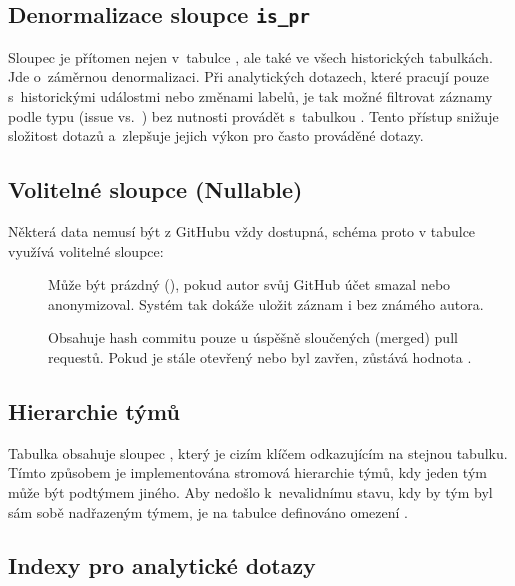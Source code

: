 \subsection{Denormalizace sloupce \texttt{is\_pr}}
\label{subsec:implementation:db_scheme:is_pr_denormalization}

Sloupec  je přítomen nejen v~tabulce , ale také ve všech historických tabulkách. Jde o~záměrnou denormalizaci. Při analytických dotazech, které pracují pouze s~historickými událostmi nebo změnami labelů, je tak možné filtrovat záznamy podle typu (issue vs.\ \PR) bez nutnosti provádět  s~tabulkou . Tento přístup snižuje složitost dotazů a~zlepšuje jejich výkon pro často prováděné dotazy.

\subsection{Volitelné sloupce (Nullable)}
\label{subsec:implementation:db_scheme:nullable}

Některá data nemusí být z GitHubu vždy dostupná, schéma proto v tabulce  využívá volitelné sloupce:

\begin{description}
  \item[] Může být prázdný (), pokud autor svůj GitHub účet smazal nebo anonymizoval. Systém tak dokáže uložit záznam i bez známého autora.
  \item[] Obsahuje hash commitu pouze u úspěšně sloučených (merged) pull requestů. Pokud je \PR stále otevřený nebo byl zavřen, zůstává hodnota .
\end{description}

\subsection{Hierarchie týmů}
\label{subsec:implementation:db_scheme:team_hierarchy}

Tabulka  obsahuje sloupec , který je cizím klíčem odkazujícím na stejnou tabulku. Tímto způsobem je implementována stromová hierarchie týmů, kdy jeden tým může být podtýmem jiného. Aby nedošlo k~nevalidnímu stavu, kdy by tým byl sám sobě nadřazeným týmem, je na tabulce definováno  omezení .

\subsection{Indexy pro analytické dotazy}
\label{subsec:implementation:db_scheme:indexes}


